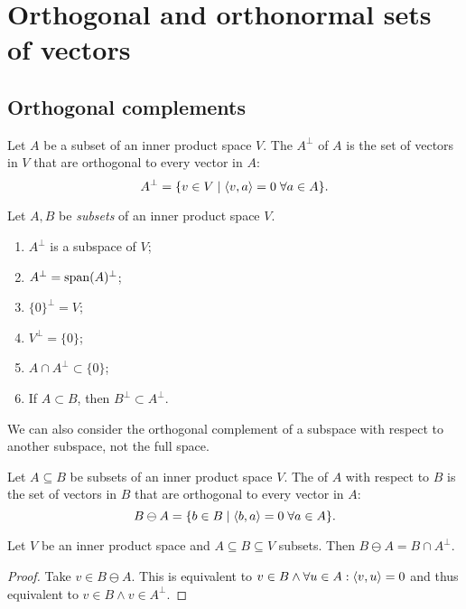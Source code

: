 \section{Orthogonal and orthonormal sets of vectors}
\subsection{Orthogonal complements}
\begin{definition}
Let $A$ be a subset of an inner product space $V$. The  $A^\perp$ of $A$ is the set of vectors in $V$ that are orthogonal to every vector in $A$:
\[ A^\perp = \{ v\in V\;|\; \inner{v,a}=0\; \forall a\in A \}. \]
\end{definition}

\begin{proposition} \label{OrthogonalComplementProperties}
Let $A,B$ be \emph{subsets} of an inner product space $V$.
\begin{enumerate}
\item $A^\perp$ is a subspace of $V$;
\item $A^\perp = \operatorname{span}(A)^\perp$;
\item $\{0\}^\perp = V$;
\item $V^\perp = \{0\}$;
\item $A\cap A^\perp \subset \{0\}$;
\item If $A\subset B$, then $B^\perp \subset A^\perp$.
\end{enumerate}
\end{proposition}

We can also consider the orthogonal complement of a subspace with respect to another subspace, not the full space.
\begin{definition}
Let $A\subseteq B$ be subsets of an inner product space $V$. The  of $A$ with respect to $B$ is the set of vectors in $B$ that are orthogonal to every vector in $A$:
\[ B\ominus A = \{ b\in B\;|\; \inner{b,a}=0\; \forall a\in A \}. \]
\end{definition}

\begin{lemma} \label{ominusSubspace}
Let $V$ be an inner product space and $A\subseteq B \subseteq V$ subsets. Then $B\ominus A = B\cap A^\perp$.
\end{lemma}
\begin{proof}
Take $v\in B\ominus A$. This is equivalent to $v\in B \land \forall u\in A: \inner{v,u} =0$ and thus equivalent to $v\in B \land v\in A^\perp$.
\end{proof}

